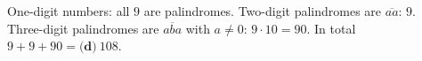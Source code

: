 One-digit numbers: all $9$ are palindromes. Two-digit palindromes are $\overline{aa}$: $9$. Three-digit palindromes are $\overline{aba}$ with $a\ne0$: $9\cdot10=90$. In total $9+9+90=\boxed{\textbf{(d)}\ 108}$.
